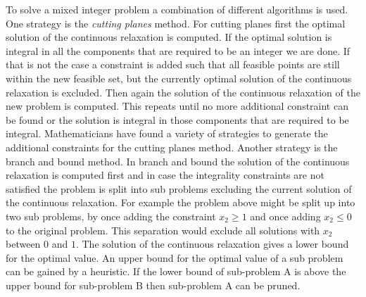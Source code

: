 To solve a mixed integer problem a combination of different algorithms is used. One strategy is the \emph{cutting planes} method. For cutting planes first the optimal solution of the continuous relaxation is computed. If the optimal solution is integral in all the components that are required to be an integer we are done. If that is not the case a constraint is added such that all feasible points are still within the new feasible set, but the currently optimal solution of the continuous relaxation is excluded. Then again the solution of the continuous relaxation of the new problem is computed. This repeats until no more additional constraint can be found or the solution is integral in those components that are required to be integral. Mathematicians have found a variety of strategies to generate the additional constraints for the cutting planes method. Another strategy is the branch and bound method. In branch and bound the solution of the continuous relaxation is computed first and in case the integrality constraints are not satisfied the problem is split into sub problems excluding the current solution of the continuous relaxation. For example the problem above might be split up into two sub problems, by once adding the constraint $x_2\geq 1$ and once adding $x_2\leq 0$ to the original problem. This separation would exclude all solutions with $x_2$ between $0$ and $1$. The solution of the continuous relaxation gives a lower bound for the optimal value. An upper bound for the optimal value of a sub problem can be gained by a heuristic. If the lower bound of sub-problem A is above the upper bound for sub-problem B then sub-problem A can be pruned.
